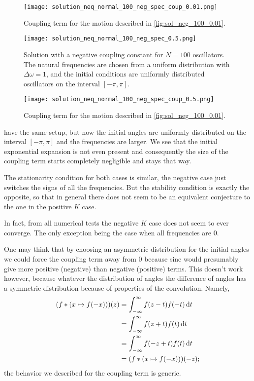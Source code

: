 \documentclass[10pt,a4paper,twocolumn]{article}
\begin{document}
\begin{figure}[!t]
    \centering
    \texttt{[image: solution\_neq\_normal\_100\_neg\_spec\_coup\_0.01.png]}
    \caption{Coupling term for the motion described in \cref{fig:sol_neg_100_0.01}.}
    \label{fig:coup_neg_100_0.01}
\end{figure}


\begin{figure}[!b]
    \centering
    \texttt{[image: solution\_neq\_normal\_100\_neg\_spec\_0.5.png]}
    \caption{Solution with a negative coupling constant for $N=100$ oscillators. The natural frequencies are chosen from a uniform distribution with $\Delta \omega = 1$, and the initial conditions are uniformly distributed oscillators on the interval $[-\pi, \pi]$.}
    \label{fig:sol_neg_100_0.5}
\end{figure}

\begin{figure}[!h]
    \centering
    \texttt{[image: solution\_neq\_normal\_100\_neg\_spec\_coup\_0.5.png]}
    \caption{Coupling term for the motion described in \cref{fig:sol_neg_100_0.01}.}
    \label{fig:coup_neg_100_0.5}
\end{figure}

 have the same setup, but now the initial angles are uniformly distributed on the interval $[-\pi, \pi]$ and the frequencies are larger. We see that the initial exponential expansion is not even present and consequently the size of the coupling term starts completely negligible and stays that way.

The stationarity condition for both cases is similar, the negative case just switches the signs of all the frequencies. But the stability condition is exactly the opposite, so that in general there does not seem to be an equivalent conjecture to the one in the positive $K$ case.

In fact, from all numerical tests the negative $K$ case does not seem to ever converge. The only exception being the case when all frequencies are $0$.

One may think that by choosing an asymmetric distribution for the initial angles we could force the coupling term away from $0$ because sine would presumably give more positive (negative) than negative (positive) terms. This doesn't work however, because whatever the distribution of angles the difference of angles has a symmetric distribution because of properties of the convolution. Namely,
%
\begin{align}
    (f * (x \mapsto f(-x)))(z) &= \int_{-\infty}^{\infty} f(z - t) f(-t) \dif t \notag\\
    &= \int_{-\infty}^{\infty} f(z + t) f(t) \dif t \\
    &= \int_{-\infty}^{\infty} f(- z + t) f(t) \dif t \notag\\
    &= (f * (x \mapsto f(-x)))(-z); \notag
\end{align} 
%
the behavior we described for the coupling term is generic.
\end{document}

